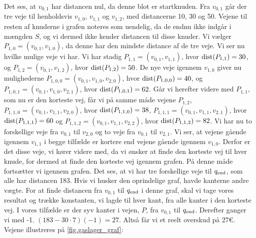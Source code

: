  


Det ses, at $v_{0,1}$ har distancen nul, da denne blot er startknuden. Fra $v_{0,1}$ går der tre veje til henholdsvis $v_{1,0}$, $v_{1,1}$ og $v_{1,2}$, med distancerne 10, 30 og 50. Vejene til resten af knuderne i grafen noteres som uendelig, da de endnu ikke indgår i mængden $S$, og vi dermed ikke kender distancen til disse knuder. Vi vælger $P_{1,0}=(v_{0,1}, v_{1,0})$, da denne har den mindste distance af de tre veje. Vi ser nu hvilke mulige veje vi har. Vi har stadig $P_{1,1}=(v_{0,1},v_{1,1})$, hvor $\textrm{dist}(P_{1,1})=30$, og $P_{1,2}=(v_{0,1},v_{1,2})$, hvor $\textrm{dist}(P_{1,2})=50$. De nye veje igennem $v_{1,0}$ giver nu mulighederne $P_{1,0,0}=(v_{0,1},v_{1,0},v_{2,0})$, hvor $\textrm{dist}(P_{1,0,0})=40$, og $P_{1,0,1}=(v_{0,1},v_{1,0},v_{2,1})$, hvor $\textrm{dist}(P_{1,0,1})=62$. Går vi herefter videre med $P_{1,1}$, som nu er den korteste vej, får vi på samme måde vejene $P_{1,2}$, $P_{1,1,0}=(v_{0,1},v_{1,1},v_{2,0})$, hvor $\textrm{dist}(P_{1,1,0})=38$, $P_{1,1,1}=(v_{0,1},v_{1,1},v_{2,1})$, hvor $\textrm{dist}(P_{1,1,1})=60$ og $P_{1,1,2}=(v_{0,1},v_{1,1},v_{2,2})$, hvor $\textrm{dist}(P_{1,1,2})=82$. Vi har nu to forskellige veje fra $v_{0,1}$ til $v_{2,0}$ og to veje fra $v_{0,1}$ til $v_{2,1}$. Vi ser, at vejene gående igennem $v_{1,1}$ i begge tilfælde er kortere end vejene gående igennem $v_{1,0}$. Derfor er det disse veje, vi kører videre med, da vi ønsker at finde den korteste vej til hver knude, for dermed at finde den korteste vej igennem grafen. På denne måde fortsætter vi igennem grafen. Det ses, at vi har tre forskellige veje til $q_{\textrm{end}}$, som alle har distancen 183. Hvis vi husker den oprindelige graf, havde kanterne andre vægte. For at finde distancen fra $v_{0,1}$ til $q_{\textrm{end}}$ i denne graf, skal vi tage vores resultat og trække konstanten, vi lagde til hver kant, fra alle kanter i den korteste vej. I vores tilfælde er der syv kanter i vejen, $P$, fra $v_{0,1}$ til $q_{\textrm{end}}$. Derefter ganger vi med -1.
$(183-30 \cdot 7) (-1) = 27$. Altså får vi et reelt overskud på 27€.
Vejene illustreres på \autoref{fig.gaslager_graf}:





